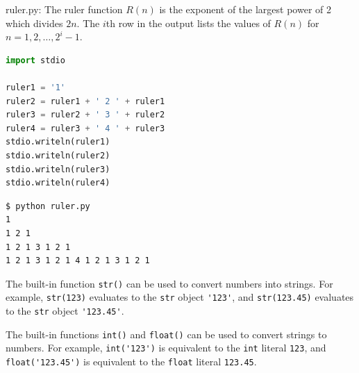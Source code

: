\documentclass[8pt,a4paper,compress,handout]{beamer}
\begin{document}
\begin{frame}[fragile]
\begin{framed}
\tiny ruler.py: The ruler function $R(n)$ is the exponent of the largest power of 2 which 
divides $2n$. The $i$th row in the output lists the values of $R(n)$ for $n=1,2,
\dots,2^i-1$.
\end{framed}

\begin{lstlisting}[language=Python]
import stdio

ruler1 = '1'
ruler2 = ruler1 + ' 2 ' + ruler1
ruler3 = ruler2 + ' 3 ' + ruler2
ruler4 = ruler3 + ' 4 ' + ruler3
stdio.writeln(ruler1)
stdio.writeln(ruler2)
stdio.writeln(ruler3)
stdio.writeln(ruler4)
\end{lstlisting}

\begin{lstlisting}[language={}]
$ python ruler.py 
1
1 2 1
1 2 1 3 1 2 1
1 2 1 3 1 2 1 4 1 2 1 3 1 2 1
\end{lstlisting}
\end{frame}

\begin{frame}[fragile]
The built-in function \lstinline{str()} can be used to convert numbers into strings. For example, \lstinline{str(123)} evaluates to the \lstinline{str} object \lstinline{'123'}, and \lstinline{str(123.45)} evaluates to the \lstinline{str} object \lstinline{'123.45'}.

\bigskip

The built-in functions \lstinline{int()} and \lstinline{float()} can be used to convert strings to numbers. For example, \lstinline{int('123')} is equivalent to the \lstinline{int} literal \lstinline{123}, and \lstinline{float('123.45')} is equivalent to the \lstinline{float} literal \lstinline{123.45}.
\end{frame}
\end{document}
